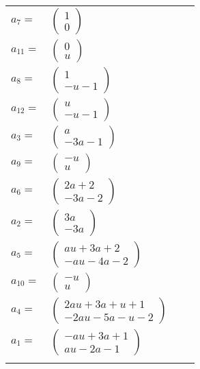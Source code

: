 \documentclass[1p]{elsarticle_modified}
\theoremstyle{definition}
\begin{document}
\begin{tabular}{m{7pt} m{180pt} m{7pt} m{180pt} }
\flushright $a_{7}=$&$\begin{pmatrix}1\\0\end{pmatrix}$ \\
\flushright $a_{11}=$&$\begin{pmatrix}0\\u\end{pmatrix}$ \\
\flushright $a_{8}=$&$\begin{pmatrix}1\\- u-1\end{pmatrix}$ \\
\flushright $a_{12}=$&$\begin{pmatrix}u\\- u-1\end{pmatrix}$ \\
\flushright $a_{3}=$&$\begin{pmatrix}a\\-3 a-1\end{pmatrix}$ \\
\flushright $a_{9}=$&$\begin{pmatrix}- u\\u\end{pmatrix}$ \\
\flushright $a_{6}=$&$\begin{pmatrix}2 a+2\\-3 a-2\end{pmatrix}$ \\
\flushright $a_{2}=$&$\begin{pmatrix}3 a\\-3 a\end{pmatrix}$ \\
\flushright $a_{5}=$&$\begin{pmatrix}a u+3 a+2\\- a u-4 a-2\end{pmatrix}$ \\
\flushright $a_{10}=$&$\begin{pmatrix}- u\\u\end{pmatrix}$ \\
\flushright $a_{4}=$&$\begin{pmatrix}2 a u+3 a+u+1\\-2 a u-5 a- u-2\end{pmatrix}$ \\
\flushright $a_{1}=$&$\begin{pmatrix}- a u+3 a+1\\a u-2 a-1\end{pmatrix}$\\&\end{tabular}
\end{document}
